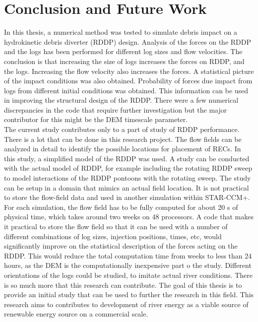 \section{Conclusion and Future Work}
In this thesis, a numerical method was tested to simulate debris impact on a hydrokinetic debris diverter (RDDP) design. Analysis of the forces on the RDDP and the logs has been performed for different log sizes and flow velocities. The conclusion is that increasing the size of logs increases the forces on RDDP, and the logs. Increasing the flow velocity also increases the forces. A statistical picture of the impact conditions was also obtained. Probability of forces due impact from logs from different initial conditions was obtained. This information can be used in improving the structural design of the RDDP. There were a few numerical discrepancies in the code that require further investigation but the major contributor for this might be the DEM timescale parameter.\\
The current study contributes only to a part of study of RDDP performance. There is a lot that can be done in this research project. The flow fields can be analyzed in detail to identify the possible locations for placement of RECs. In this study, a simplified model of the RDDP was used. A study can be conducted with the actual model of RDDP, for example including the rotating RDDP sweep to model interactions of the RDDP pontoons with the rotating sweep. The study can be setup in a domain that mimics an actual field location. It is not practical to store the flow-field data and used in another simulation within STAR-CCM+. For each simulation, the flow field has to be fully computed for about 20 s of physical time, which takes around two weeks on 48 processors. A code that makes it practical to store the flow field so that it can be used with a number of different combinations of log sizes, injection positions, times, etc, would significantly improve on the statistical description of the forces acting on the RDDP. This would reduce the total computation time from weeks to less than 24 hours, as the DEM is the computationally inexpensive part o the study. Different orientations of the logs could be studied, to imitate actual river conditions. There is so much more that this research can contribute. The goal of this thesis is to provide an initial study that can be used to further the research in this field. This research aims to contributes to development of river energy as a viable source of renewable energy source on a commercial scale. 